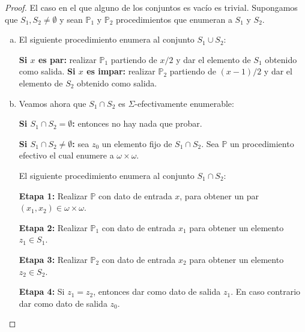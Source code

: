   \begin{proof}
    \par El caso en el que alguno de los conjuntos es vacío es trivial. Supongamos que $S_{1}, S_{2} \neq \emptyset$ y
    sean $\mathbb{P}_{1}$ y $\mathbb{P}_{2}$ procedimientos que enumeran a $S_{1}$ y $S_{2}$.

    \begin{enumerate}[a)]
      \item El siguiente procedimiento enumera al conjunto $S_{1} \cup S_{2}$:

        \textbf{Si $x$ es par:} realizar $\mathbb{P}_{1}$ partiendo de $x/2$ y dar el elemento de $S_{1}$ obtenido como
        salida.
        \textbf{Si $x$ es impar:} realizar $\mathbb{P}_{2}$ partiendo de $(x-1)/2$ y dar el elemento de $S_{2}$ obtenido
        como salida.

      \item Veamos ahora que $S_{1} \cap S_{2}$ es $\Sigma$-efectivamente enumerable:

        \textbf{Si $S_{1} \cap S_{2} = \emptyset$:} entonces no hay nada que probar.

        \textbf{Si $S_{1} \cap S_{2} \neq \emptyset$:} sea $z_{0}$ un elemento fijo de $S_{1} \cap S_{2}$. Sea
        $\mathbb{P}$ un procedimiento efectivo el cual enumere a $\omega \times \omega$.

        \vspace{3mm}
        \par El siguiente procedimiento enumera al conjunto $S_{1} \cap S_{2}$:

        \textbf{Etapa 1:}
        Realizar $\mathbb{P}$ con dato de entrada $x$, para obtener un par $(x_{1}, x_{2}) \in \omega \times \omega $.

        \textbf{Etapa 2:}
        Realizar $\mathbb{P}_{1}$ con dato de entrada $x_{1}$ para obtener un elemento $z_{1} \in S_{1}$.

        \textbf{Etapa 3:}
        Realizar $\mathbb{P}_{2}$ con dato de entrada $x_{2}$ para obtener un elemento $z_{2} \in S_{2}$.

        \textbf{Etapa 4:}
        Si $z_{1} = z_{2}$, entonces dar como dato de salida $z_{1}$. En caso contrario dar como dato de salida $z_{0}$.
    \end{enumerate}
  \end{proof}

